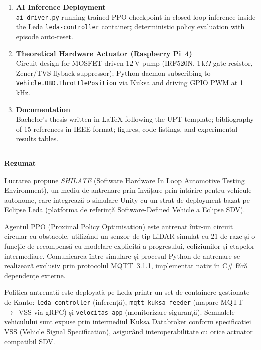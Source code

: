 \documentclass[12pt, a4paper]{article}
\begin{document}
\begin{enumerate}[leftmargin=1.4cm, itemsep=3pt]
  \item \textbf{AI Inference Deployment}\\
        \texttt{ai\_driver.py} running trained PPO checkpoint in closed-loop
        inference inside the Leda \texttt{leda-controller} container;
        deterministic policy evaluation with episode auto-reset.

  \item \textbf{Theoretical Hardware Actuator (Raspberry Pi~4)}\\
        Circuit design for MOSFET-driven 12\,V pump (IRF520N, 1\,k$\Omega$
        gate resistor, Zener/TVS flyback suppressor); Python daemon subscribing
        to \texttt{Vehicle.OBD.ThrottlePosition} via Kuksa and driving GPIO PWM
        at 1\,kHz.

  \item \textbf{Documentation}\\
        Bachelor's thesis written in \LaTeX{} following the UPT template;
        bibliography of 15 references in IEEE format; figures, code listings,
        and experimental results tables.
\end{enumerate}

\vspace{4pt}
\noindent\rule{\textwidth}{0.4pt}
\vspace{4pt}

\noindent\textbf{Rezumat}\par\smallskip
\noindent
Lucrarea propune \textit{SHILATE} (Software Hardware In Loop Automotive Testing
Environment), un mediu de antrenare prin învățare prin întărire pentru vehicule
autonome, care integrează o simulare Unity cu un strat de deployment bazat pe
Eclipse Leda (platforma de referință Software-Defined Vehicle a Eclipse SDV).

Agentul PPO (Proximal Policy Optimisation) este antrenat într-un circuit
circular cu obstacole, utilizând un senzor de tip LiDAR simulat cu 21 de raze
și o funcție de recompensă cu modelare explicită a progresului, coliziunilor și
etapelor intermediare. Comunicarea între simulare și procesul Python de
antrenare se realizează exclusiv prin protocolul MQTT~3.1.1, implementat nativ
în C\# fără dependențe externe.

Politica antrenată este deployată pe Leda printr-un set de containere gestionate
de Kanto: \texttt{leda-controller} (inferență), \texttt{mqtt-kuksa-feeder}
(mapare MQTT~$\to$~VSS via gRPC) și \texttt{velocitas-app} (monitorizare
siguranță). Semnalele vehiculului sunt expuse prin intermediul Kuksa Databroker
conform specificației VSS (Vehicle Signal Specification), asigurând
interoperabilitate cu orice actuator compatibil SDV.
\end{document}
